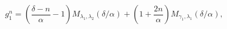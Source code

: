 \begin{equation}
g^{n}_{1}=\left( \frac{\delta-n}{\alpha}-1\right)M_{\lambda_1,\lambda_2}
(\delta/\alpha)+\left( 1+\frac{2n}{\alpha}\right)M_{\gamma_1,\lambda_1}
(\delta/\alpha),
\label{28}
\end{equation}

